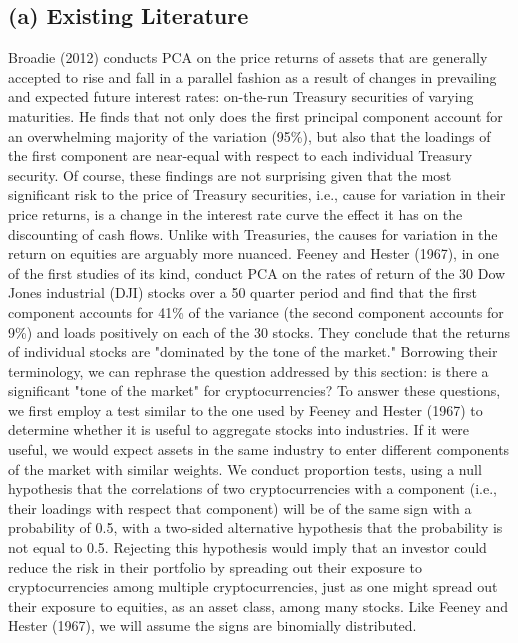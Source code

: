 \documentclass[12pt,twoside]{article}
\begin{document}
\subsection{(a) Existing Literature}
Broadie (2012) conducts PCA on the price returns of assets that are generally accepted to rise and fall in a parallel fashion as a result of changes in prevailing and expected future interest rates: on-the-run Treasury securities of varying maturities. He finds that not only does the first principal component account for an overwhelming majority of the variation (95\%), but also that the loadings of the first component are near-equal with respect to each individual Treasury security. Of course, these findings are not surprising given that the most significant risk to the price of Treasury securities, i.e., cause for variation in their price returns, is a change in the interest rate curve the effect it has on the discounting of cash flows. Unlike with Treasuries, the causes for variation in the return on equities are arguably more nuanced. Feeney and Hester (1967), in one of the first studies of its kind, conduct PCA on the rates of return of the 30 Dow Jones industrial (DJI) stocks over a 50 quarter period and find that the first component accounts for 41\% of the variance (the second component accounts for 9\%) and loads positively on each of the 30 stocks. They conclude that the returns of individual stocks are "dominated by the tone of the market." Borrowing their terminology, we can rephrase the question addressed by this section: is there a significant "tone of the market" for cryptocurrencies?
\bigbreak
To answer these questions, we first employ a test similar to the one used by Feeney and Hester (1967) to determine whether it is useful to aggregate stocks into industries. If it were useful, we would expect assets in the same industry to enter different components of the market with similar weights. We conduct proportion tests, using a null hypothesis that the correlations of two cryptocurrencies with a component (i.e., their loadings with respect that component) will be of the same sign with a probability of 0.5, with a two-sided alternative hypothesis that the probability is not equal to 0.5. Rejecting this hypothesis would imply that an investor could reduce the risk in their portfolio by spreading out their exposure to cryptocurrencies among multiple cryptocurrencies, just as one might spread out their exposure to equities, as an asset class, among many stocks. Like Feeney and Hester (1967), we will assume the signs are binomially distributed.
\end{document}
